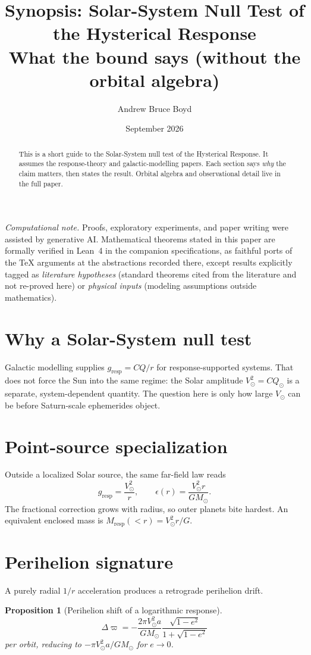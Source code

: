 \documentclass[11pt]{article}
\title{\textbf{Synopsis: Solar-System Null Test of the Hysterical Response}\\[0.35em]
\large What the bound says (without the orbital algebra)}
\author{Andrew Bruce Boyd}
\date{September 2026}
\newtheorem{proposition}[theorem]{Proposition}
\theoremstyle{definition}
\theoremstyle{remark}
\begin{document}
\maketitle
\noindent\textit{Computational note.}
Proofs, exploratory experiments, and paper writing were assisted by generative AI.
Mathematical theorems stated in this paper are formally verified in Lean~4 in the
companion specifications, as faithful ports of the TeX arguments at the abstractions
recorded there, except results explicitly tagged as \emph{literature hypotheses}
(standard theorems cited from the literature and not re-proved here) or
\emph{physical inputs} (modeling assumptions outside mathematics).

\begin{abstract}
This is a short guide to the Solar-System null test of the Hysterical Response.
It assumes the response-theory and galactic-modelling papers.
Each section says \emph{why} the claim matters, then states the result.
Orbital algebra and observational detail live in the full paper.
\end{abstract}

\section{Why a Solar-System null test}
Galactic modelling supplies $g_{\mathrm{resp}}=CQ/r$ for response-supported systems.
That does not force the Sun into the same regime: the Solar amplitude $V_\odot^{2}=CQ_\odot$ is a separate, system-dependent quantity.
The question here is only how large $V_\odot$ can be before Saturn-scale ephemerides object.

\section{Point-source specialization}
Outside a localized Solar source, the same far-field law reads
\[
  g_{\mathrm{resp}}=\frac{V_\odot^{2}}{r},
  \qquad
  \epsilon(r)=\frac{V_\odot^{2}r}{GM_\odot}.
\]
The fractional correction grows with radius, so outer planets bite hardest.
An equivalent enclosed mass is $M_{\mathrm{resp}}(<r)=V_\odot^{2}r/G$.

\section{Perihelion signature}
A purely radial $1/r$ acceleration produces a retrograde perihelion drift.

\begin{proposition}[Perihelion shift of a logarithmic response]
\[
\Delta\varpi
=-\frac{2\pi V_\odot^{2} a}{GM_\odot}
\frac{\sqrt{1-e^{2}}}{1+\sqrt{1-e^{2}}}
\]
per orbit, reducing to $-\pi V_\odot^{2}a/GM_\odot$ for $e\to0$.
\end{proposition}
\end{document}
